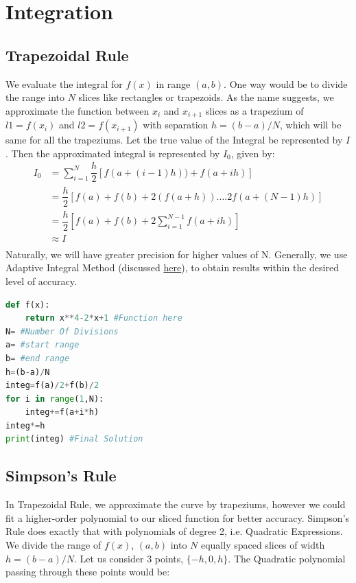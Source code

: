 \section{Integration}
\label{sec:Int}
\subsection{Trapezoidal Rule}
We evaluate the integral for $f(x)$ in range $(a,b)$. One way would be to divide the range into $N$ slices like rectangles or trapezoids. As the name suggests, we approximate the function between $x_{i}$ and $x_{i+1}$ slices as a trapezium of $l1=f(x_{i})$ and $l2=f(x_{i+1})$ with separation  $h=(b-a)/N$, which will be same for all the trapeziums. Let the true value of the Integral be represented by $I$. Then the approximated integral is represented by $I_{0}$, given by:
\[\begin{split}
I_{0}&=\sum_{i=1}^{N}\dfrac{h}{2}[f(a+(i-1)h))+f(a+ih)] \\
&=\dfrac{h}{2}[f(a)+f(b)+2(f(a+h))....2f(a+(N-1)h)]\\
&= \dfrac{h}{2}[f(a)+f(b)+2\sum_{i=1}^{N-1}f(a+ih)]\\
&\approx I\\
\end{split}
\]
Naturally, we will have greater precision for higher values of N. Generally, we use Adaptive Integral Method (discussed \hyperref[subsec:3.4]{here}), to obtain results within the desired level of accuracy.
\begin{lstlisting}[language=Python, caption=Trapezoidal Rule, frame=single, label={lst:L3} ]
def f(x):
	return x**4-2*x+1 #Function here
N= #Number Of Divisions
a= #start range
b= #end range
h=(b-a)/N
integ=f(a)/2+f(b)/2
for i in range(1,N):
	integ+=f(a+i*h)
integ*=h
print(integ) #Final Solution
\end{lstlisting}
\subsection{Simpson's Rule}
In Trapezoidal Rule, we approximate the curve by trapeziums, however we could fit a higher-order polynomial to our sliced function for better accuracy. Simpson's Rule does exactly that with polynomials of degree 2, i.e. Quadratic Expressions. We divide the range of $f(x)$, $(a,b)$ into $N$ equally spaced slices of width $h=(b-a)/N$. Let us consider 3 points, $\{-h,0,h\}$. The Quadratic polynomial passing through these points would be:
 
